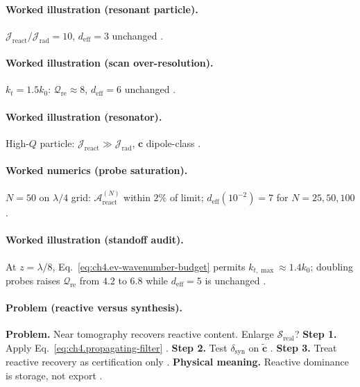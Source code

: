 \paragraph{Worked illustration (resonant particle).}
\(\mathcal{J}_{\mathrm{react}}/\mathcal{J}_{\mathrm{rad}}=10\), \(d_{\mathrm{eff}}=3\) unchanged \cite{jackson1999,hansen1988,harrington2001,stratton1941}.

\paragraph{Worked illustration (scan over-resolution).}
\(k_{t}=1.5k_{0}\): \(\mathcal{Q}_{\mathrm{re}}\approx8\), \(d_{\mathrm{eff}}=6\) unchanged \cite{harrington2001,jackson1999,hansen1988}.

\paragraph{Worked illustration (resonator).}
High-\(Q\) particle: \(\mathcal{J}_{\mathrm{react}}\gg\mathcal{J}_{\mathrm{rad}}\), \(\mathbf{c}\) dipole-class \cite{jackson1999,stratton1941,harrington2001}.

\paragraph{Worked numerics (probe saturation).}
\(N=50\) on \(\lambda/4\) grid: \(\mathcal{A}_{\mathrm{react}}^{(N)}\) within \(2\%\) of limit; \(d_{\mathrm{eff}}(10^{-2})=7\) for \(N=25,50,100\)
\cite{harrington2001,hansen1988,devaney2004}.

\paragraph{Worked illustration (standoff audit).}
At \(z=\lambda/8\), Eq.~\eqref{eq:ch4.ev-wavenumber-budget} permits \(k_{t,\max}\approx1.4k_{0}\); doubling probes raises \(\mathcal{Q}_{\mathrm{re}}\) from
\(4.2\) to \(6.8\) while \(d_{\mathrm{eff}}=5\) is unchanged \cite{jackson1999,harrington2001,devaney2004,hansen1988}.

\paragraph{Problem (reactive versus synthesis).}
\textbf{Problem.} Near tomography recovers reactive content. Enlarge \(\mathcal{S}_{\mathrm{real}}\)?
\textbf{Step 1.} Apply Eq.~\eqref{eq:ch4.propagating-filter} \cite{stratton1941,harrington2001}.
\textbf{Step 2.} Test \(\delta_{\mathrm{syn}}\) on \(\widetilde{\mathbf{c}}\) \cite{devaney2004,hansen1988}.
\textbf{Step 3.} Treat reactive recovery as certification only \cite{harrington2001}.
\textbf{Physical meaning.} Reactive dominance is storage, not export \cite{stratton1941}.

